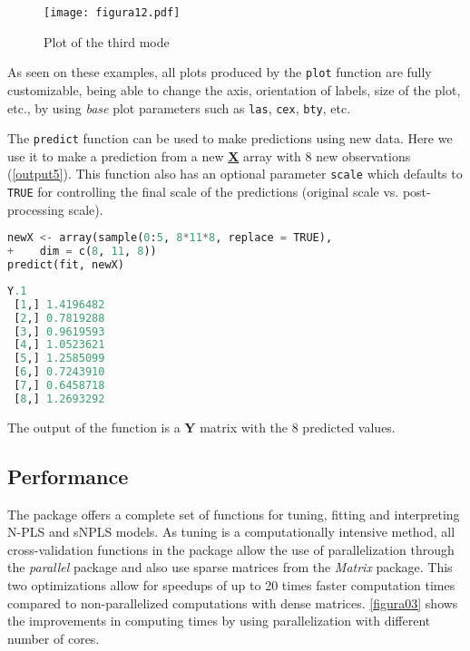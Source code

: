 \begin{figure}[!ht]
	\centering
\texttt{[image: figura12.pdf]}
\caption{Plot of the third mode}
\label{figura12}
\end{figure}

As seen on these examples, all plots produced by the \texttt{plot} function are fully customizable, being able to change the axis, orientation of labels, size of the plot, etc., by using \textit{base} plot parameters such as \texttt{las}, \texttt{cex}, \texttt{bty}, etc.

The \texttt{predict} function can be used to make predictions using new data. Here we use it to make a prediction from a new \textbf{\underline{X}} array with 8 new observations (\autoref{output5}). This function also has an optional parameter \texttt{scale} which defaults to \texttt{TRUE} for controlling the final scale of the predictions (original scale vs. post-processing scale).

\vspace{15pt}
\begin{lstlisting}[basicstyle=\small, language=Python]
newX <- array(sample(0:5, 8*11*8, replace = TRUE), 
+    dim = c(8, 11, 8))
predict(fit, newX)
\end{lstlisting}
\vspace{15pt}
\begin{lstlisting}[basicstyle=\small, backgroundcolor=\color{output}, numbers=none, label={output5}, language=Python, caption=Predictions of the model on new data \texttt{newX}.]
            Y.1
 [1,] 1.4196482
 [2,] 0.7819288
 [3,] 0.9619593
 [4,] 1.0523621
 [5,] 1.2585099
 [6,] 0.7243910
 [7,] 0.6458718
 [8,] 1.2693292
\end{lstlisting}

The output of the function is a \textbf{Y} matrix with the 8 predicted values.

\subsection{Performance}
The package offers a complete set of functions for tuning, fitting and interpreting N-PLS and sNPLS models. As tuning is a computationally intensive method, all cross-validation functions in the package allow the use of parallelization through the \textit{parallel} package and also use sparse matrices from the \textit{Matrix} package. This two optimizations allow for speedups of up to 20 times faster computation times compared to non-parallelized computations with dense matrices. \autoref{figura03} shows the improvements in computing times by using parallelization with different number of cores.

